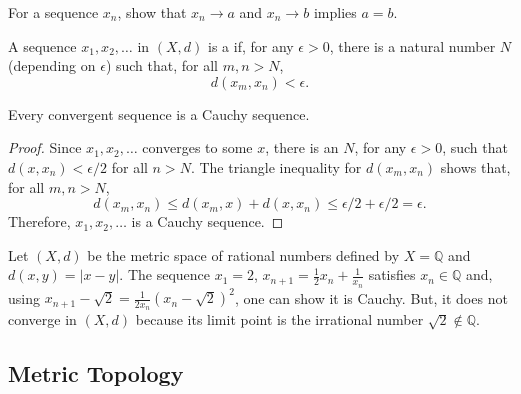 \begin{problem}
For a sequence $x_n$, show that $x_n \to a$ and $x_n \to b$ implies $a=b$.
\end{problem}

\begin{definition}
A sequence $x_1,x_2,\ldots$ in $(X,d)$ is a  if, for any $\epsilon >0$, there is a natural number $N$ (depending on $\epsilon$) such that, for all $m,n > N$,
\begin{equation*}
d \left( x_m, x_n \right) < \epsilon.
\end{equation*}
\end{definition}



\begin{theorem}
Every convergent sequence is a Cauchy sequence.
\end{theorem}
\begin{proof}
Since $x_1,x_2,\ldots$ converges to some $x$, there is an $N$, for any $\epsilon>0$, such that $d(x,x_n)<\epsilon /2$ for all $n>N$.
The triangle inequality for $d(x_m,x_n)$ shows that, for all $m,n>N$,
\[ d(x_m,x_n)\leq d(x_m,x) + d(x,x_n) \leq \epsilon/2 + \epsilon/2 = \epsilon. \]
Therefore, $x_1,x_2,\ldots$ is a Cauchy sequence.
\end{proof}

\begin{example}
Let $(X,d)$ be the metric space  of rational numbers defined by $X=\mathbb{Q}$ and $d(x,y)=|x-y|$.
The sequence $x_1 = 2$, $x_{n+1} = \frac{1}{2}x_n + \frac{1}{x_n}$ satisfies $x_n \in \mathbb{Q} $ and, using $x_{n+1} - \sqrt{2} = \frac{1}{2x_n}(x_n-\sqrt{2})^2$, one can show it is Cauchy. But, it does not converge in $(X,d)$ because its limit point is the irrational number $\sqrt{2} \notin \mathbb{Q}$.
\end{example}


\subsection{Metric Topology}

